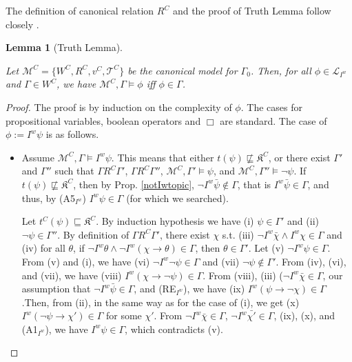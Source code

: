 \documentclass{article}
\newtheorem{lemma}{Lemma}
\begin{document}
The definition of canonical relation $R^{C}$ and the proof of Truth Lemma follow closely \cite[p. 84-85]{Fan2015}.

\begin{lemma}[Truth Lemma]
\label{truthIW}

Let $\mathcal{M}^{C} = \{W^{C}, R^{C}, v^{C}, \mathcal{T}^{C}\}$ be the canonical model for $\Gamma_{0}$. Then, for all $\phi \in \mathcal{L}_{I^{w}}$ and $\Gamma \in W^{C}$, we have $\mathcal{M}^{C}, \Gamma \models \phi$ iff $\phi \in \Gamma$.


\end{lemma}

\begin{proof}

The proof is by induction on the complexity of $\phi$. The cases for propositional variables, boolean operators and $\Box$ are standard. The case of $\phi := I^{w} \psi$ is as follows.

\begin{itemize}

\item[($\Rightarrow$)] Assume $\mathcal{M}^{C}, \Gamma \models I^{w} \psi$. This means that either $t(\psi) \not \sqsubseteq \mathfrak{K}^{C}$, or there exist $\Gamma'$ and $\Gamma''$ such that $\Gamma R^{C} \Gamma'$, $\Gamma R^{C} \Gamma''$, $\mathcal{M}^{C}, \Gamma' \models \psi$, and $\mathcal{M}^{C}, \Gamma'' \models \neg \psi$. If $t(\psi) \not \sqsubseteq \mathfrak{K}^{C}$, then by Prop. \ref{notIwtopic}, $\neg I^{w} \bar{\psi} \not \in \Gamma$, that is $I^{w} \bar{\psi} \in \Gamma$, and thus, by (A5$_{I^{w}}$) $I^{w} \psi \in \Gamma$ (for which we searched).

Let $t^{C}(\psi) \sqsubseteq \mathfrak{K}^{C}$. By induction hypothesis we have (i) $\psi \in \Gamma'$ and (ii) $\neg \psi \in \Gamma''$. By definition of $\Gamma R^{C} \Gamma'$, there exist $\chi$ s.t. (iii) $\neg I^{w}\bar{\chi} \wedge I^{w} \chi \in \Gamma$ and (iv) for all $\theta$, if $\neg I^{w} \theta \wedge \neg I^{w} (\chi \rightarrow \theta) \in \Gamma$, then $\theta \in \Gamma'$. Let (v) $\neg I^{w} \psi \in \Gamma$. From (v) and (i), we have (vi) $\neg I^{w} \neg \psi \in \Gamma$ and (vii) $\neg \psi \not \in \Gamma'$. From (iv), (vi), and (vii), we have (viii) $I^{w}( \chi \rightarrow \neg \psi) \in \Gamma$. From (viii), (iii) ($\neg I^{w} \bar{\chi} \in \Gamma$, our assumption that $\neg I^{w} \bar{\psi} \in \Gamma$, and (RE$_{I^{w}}$), we have (ix) $I^{w}(\psi \rightarrow \neg \chi) \in \Gamma$.Then, from (ii), in the same way as for the case of (i), we get (x) $I^{w}(\neg \psi \rightarrow \chi') \in \Gamma$ for some $\chi'$. From $\neg I^{w} \bar{\chi} \in \Gamma$, $\neg I^{w} \bar{\chi'} \in \Gamma$,  (ix), (x), and (A1$_{I^{w}}$), we have $I^{w} \psi \in \Gamma$, which contradicts (v).



\end{itemize}
\end{proof}
\end{document}
